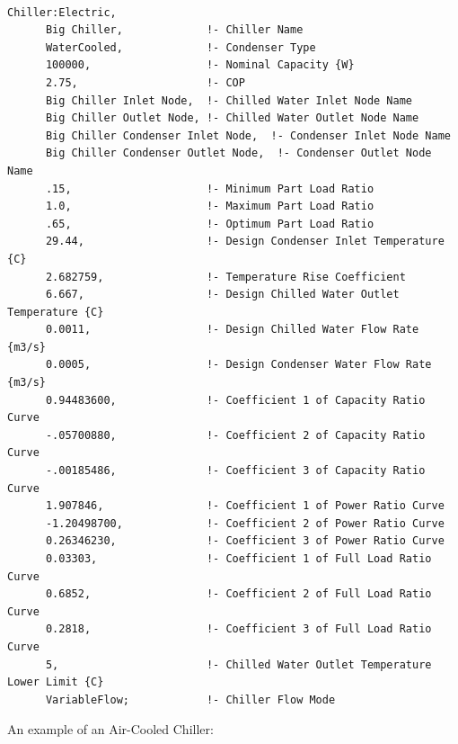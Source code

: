 \begin{lstlisting}

Chiller:Electric,
      Big Chiller,             !- Chiller Name
      WaterCooled,             !- Condenser Type
      100000,                  !- Nominal Capacity {W}
      2.75,                    !- COP
      Big Chiller Inlet Node,  !- Chilled Water Inlet Node Name
      Big Chiller Outlet Node, !- Chilled Water Outlet Node Name
      Big Chiller Condenser Inlet Node,  !- Condenser Inlet Node Name
      Big Chiller Condenser Outlet Node,  !- Condenser Outlet Node Name
      .15,                     !- Minimum Part Load Ratio
      1.0,                     !- Maximum Part Load Ratio
      .65,                     !- Optimum Part Load Ratio
      29.44,                   !- Design Condenser Inlet Temperature {C}
      2.682759,                !- Temperature Rise Coefficient
      6.667,                   !- Design Chilled Water Outlet Temperature {C}
      0.0011,                  !- Design Chilled Water Flow Rate {m3/s}
      0.0005,                  !- Design Condenser Water Flow Rate {m3/s}
      0.94483600,              !- Coefficient 1 of Capacity Ratio Curve
      -.05700880,              !- Coefficient 2 of Capacity Ratio Curve
      -.00185486,              !- Coefficient 3 of Capacity Ratio Curve
      1.907846,                !- Coefficient 1 of Power Ratio Curve
      -1.20498700,             !- Coefficient 2 of Power Ratio Curve
      0.26346230,              !- Coefficient 3 of Power Ratio Curve
      0.03303,                 !- Coefficient 1 of Full Load Ratio Curve
      0.6852,                  !- Coefficient 2 of Full Load Ratio Curve
      0.2818,                  !- Coefficient 3 of Full Load Ratio Curve
      5,                       !- Chilled Water Outlet Temperature Lower Limit {C}
      VariableFlow;            !- Chiller Flow Mode
\end{lstlisting}

An example of an Air-Cooled Chiller:

